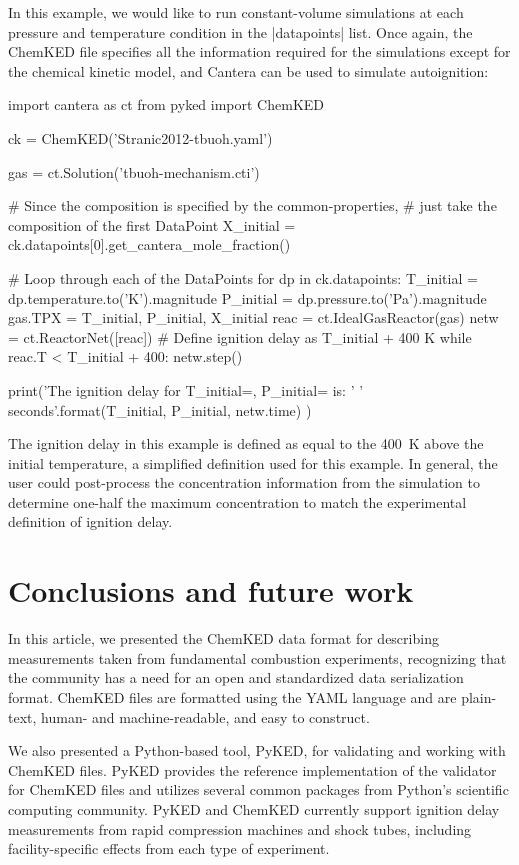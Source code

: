 \documentclass[12pt]{ijck}
\newcommand\ck{ChemKED}
\newcommand\pk{PyKED}
\begin{document}
In this example, we would like to run constant-volume simulations at each
pressure and temperature condition in the \yabox|datapoints| list. Once again,
the \ck{} file specifies all the information required for the simulations except
for the chemical kinetic model, and Cantera can be used to simulate autoignition:
%
\begin{pythonbox}
import cantera as ct
from pyked import ChemKED

ck = ChemKED('Stranic2012-tbuoh.yaml')

gas = ct.Solution('tbuoh-mechanism.cti')

# Since the composition is specified by the common-properties,
# just take the composition of the first DataPoint
X_initial = ck.datapoints[0].get_cantera_mole_fraction()

# Loop through each of the DataPoints
for dp in ck.datapoints:
    T_initial = dp.temperature.to('K').magnitude
    P_initial = dp.pressure.to('Pa').magnitude
    gas.TPX = T_initial, P_initial, X_initial
    reac = ct.IdealGasReactor(gas)
    netw = ct.ReactorNet([reac])
    # Define ignition delay as T_initial + 400 K
    while reac.T < T_initial + 400:
        netw.step()

    print('The ignition delay for T_initial={}, P_initial={} is: '
          '{} seconds'.format(T_initial, P_initial, netw.time)
          )
\end{pythonbox}
%
The ignition delay in this example is defined as equal to the \SI{400}{\kelvin}
above the initial temperature, a simplified definition used for this example.
In general, the user could post-process the concentration information from the
simulation to determine one-half the maximum  concentration to match
the experimental definition of ignition delay.
\section{Conclusions and future work}

In this article, we presented the \ck{} data format for describing measurements
taken from fundamental combustion experiments, recognizing that the community
has a need for an open and standardized data serialization format. \ck{} files
are formatted using the YAML language and are plain-text, human- and
machine-readable, and easy to construct.

We also presented a Python-based tool, \pk{}, for validating and working
with \ck{} files. \pk{} provides the reference implementation of the validator
for \ck{} files and utilizes several common packages from Python's scientific
computing community. \pk{} and \ck{} currently support ignition delay
measurements from rapid compression machines and shock tubes, including
facility-specific effects from each type of experiment.
\end{document}
